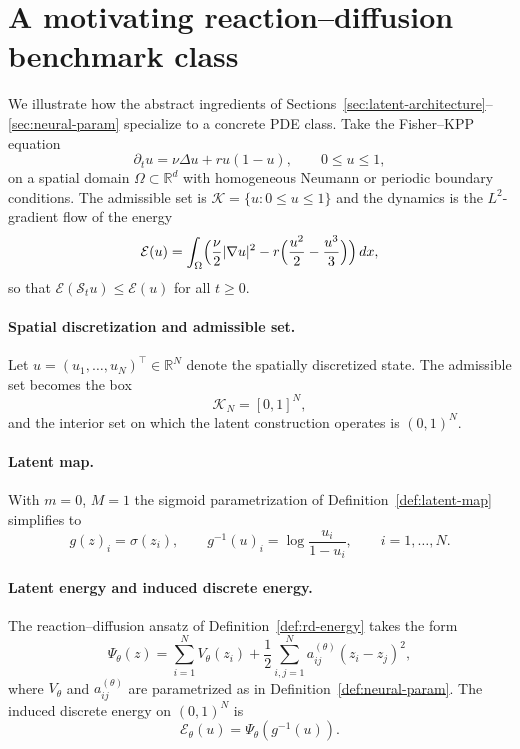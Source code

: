 \documentclass[11pt]{article}
\newcommand{\R}{\mathbb{R}}
\newcommand{\cS}{\mathcal{S}}
\newcommand{\cK}{\mathcal{K}}
\newcommand{\cE}{\mathcal{E}}
\begin{document}
\section{A motivating reaction--diffusion benchmark class}\label{sec:benchmark}

We illustrate how the abstract ingredients of Sections~\ref{sec:latent-architecture}--\ref{sec:neural-param} specialize to a concrete PDE class. Take the Fisher--KPP equation
\begin{equation}\label{eq:fisher-kpp-bench}
\partial_t u = \nu \Delta u + r u(1-u), \qquad 0\le u\le 1,
\end{equation}
on a spatial domain \(\Omega\subset\R^d\) with homogeneous Neumann or periodic boundary conditions. The admissible set is \(\cK=\{u:0\le u\le 1\}\) and the dynamics is the \(L^2\)-gradient flow of the energy
\begin{equation}\label{eq:fisher-energy}
\cE(u)=\int_\Omega\Bigl(\frac{\nu}{2}|\nabla u|^2 - r\Bigl(\frac{u^2}{2}-\frac{u^3}{3}\Bigr)\Bigr)\,dx,
\end{equation}
so that \(\cE(\cS_t u)\le\cE(u)\) for all \(t\ge 0\).

\paragraph{Spatial discretization and admissible set.}
Let \(u=(u_1,\dots,u_N)^\top\in\R^N\) denote the spatially discretized state. The admissible set becomes the box
\begin{equation}\label{eq:KN-fisher}
\cK_N=[0,1]^N,
\end{equation}
and the interior set on which the latent construction operates is \((0,1)^N\).

\paragraph{Latent map.}
With \(m=0\), \(M=1\) the sigmoid parametrization of Definition~\ref{def:latent-map} simplifies to
\begin{equation}\label{eq:g-fisher}
g(z)_i=\sigma(z_i),\qquad g^{-1}(u)_i=\log\frac{u_i}{1-u_i},\qquad i=1,\dots,N.
\end{equation}

\paragraph{Latent energy and induced discrete energy.}
The reaction--diffusion ansatz of Definition~\ref{def:rd-energy} takes the form
\begin{equation}\label{eq:psi-fisher}
\Psi_{\theta}(z)=\sum_{i=1}^N V_{\theta}(z_i)+\frac12\sum_{i,j=1}^N a_{ij}^{(\theta)}(z_i-z_j)^2,
\end{equation}
where \(V_{\theta}\) and \(a_{ij}^{(\theta)}\) are parametrized as in Definition~\ref{def:neural-param}. The induced discrete energy on \((0,1)^N\) is
\begin{equation}\label{eq:Etheta-fisher}
\cE_{\theta}(u)=\Psi_{\theta}(g^{-1}(u)).
\end{equation}
\end{document}
